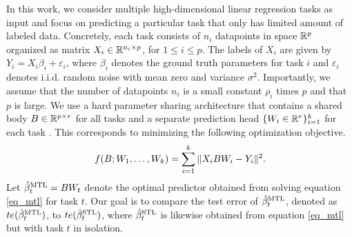 In this work, we consider multiple high-dimensional linear regression tasks as input and focus on predicting a particular task that only has limited amount of labeled data.
Concretely, each task consists of $n_i$ datapoints in space $\mathbb{R}^p$ organized as matrix $X_i\in\mathbb{R}^{n_i\times p}$, for $1\le i\le p$.
The labels of $X_i$ are given by $Y_i = X_i\beta_i + \varepsilon_i$, where $\beta_i$ denotes the ground truth parameters for task $i$ and $\varepsilon_i$ denotes i.i.d. random noise with mean zero and variance $\sigma^2$.
Importantly, we assume that the number of datapoints $n_i$ is a small constant $\rho_i$ times $p$ and that $p$ is large. 
We use a hard parameter sharing architecture that contains a shared body $B\in\mathbb{R}^{p\times r}$ for all tasks and a separate prediction head $\{W_i \in \mathbb{R}^{r}\}_{i=1}^k$ for each task \cite{R17,MTDNN19}.
This corresponds to minimizing the following optimization objective.
\begin{align}
	\label{eq_mtl}
	f(B; W_1, \dots, W_k) = \sum_{i=1}^k \|X_i B W_i - Y_i\|^2.
\end{align}
Let $\hat{\beta}_t^{\text{MTL}} = B W_t$ denote the optimal predictor obtained from solving equation \eqref{eq_mtl} for task $t$.
Our goal is to compare the test error of $\hat{\beta}_t^{\text{MTL}}$, denoted as $te(\hat{\beta}_t^{\text{MTL}})$, to $te(\hat{\beta}_t^{\text{STL}})$, where $\hat{\beta}_t^{\text{STL}}$ is likewise obtained from equation \eqref{eq_mtl} but with task $t$ in isolation.


